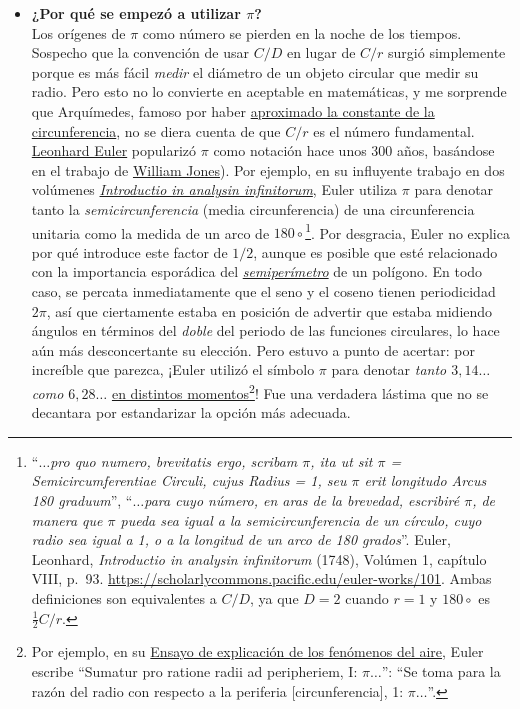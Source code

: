 \begin{itemize}
  \item \textbf{¿Por qué se empezó a utilizar $\pi$?} \\ Los orígenes de $\pi$ como número se pierden en la noche de los tiempos. Sospecho que la convención de usar $C/D$ en lugar de $C/r$ surgió simplemente porque es más fácil \emph{medir} el diámetro de un objeto circular que medir su radio. Pero esto no lo convierte en aceptable en matemáticas, y me sorprende que Arquímedes, famoso por haber \href{http://itech.fgcu.edu/faculty/clindsey/mhf4404/archimedes/archimedes.html}{aproximado la constante de la circunferencia}, no se diera cuenta de que $C/r$ es el número fundamental. \href{https://es.wikipedia.org/wiki/Leonhard_Euler}{Leonhard Euler} popularizó $\pi$ como notación hace unos 300 años, basándose en el trabajo de \href{https://es.wikipedia.org/wiki/William_Jones_(matemático)}{William Jones}). Por ejemplo, en su influyente trabajo en dos volúmenes \href{https://es.wikipedia.org/wiki/Introductio_in_analysin_infinitorum}{\emph{Introductio in analysin infinitorum}}, Euler utiliza $\pi$ para denotar tanto la \emph{semicircunferencia} (media circunferencia) de una circunferencia unitaria como la medida de un arco de $180\circ$\footnote{``\emph{$\ldots$pro quo numero, brevitatis ergo, scribam $\pi$, ita ut sit $\pi$ = Semicircumferentiae Circuli, cujus Radius = 1, seu $\pi$ erit longitudo Arcus 180 graduum}'', ``\emph{$\ldots$para cuyo número, en aras de la brevedad, escribiré $\pi$, de manera que $\pi$ pueda sea igual a la semicircunferencia de un círculo, cuyo radio sea igual a 1, o a la longitud de un arco de 180 grados}''. Euler, Leonhard, \emph{Introductio in analysin infinitorum} (1748), Volúmen 1, capítulo VIII, p.~93. \href{https://scholarlycommons.pacific.edu/euler-works/101}{https://scholarlycommons.pacific.edu/euler-works/101}. Ambas definiciones son equivalentes a $C/D$, ya que $D=2$ cuando $r=1$ y $180\circ$ es $\frac{1}{2}C/r$.}. Por desgracia, Euler no explica por qué introduce este factor de $1/2$, aunque es posible que esté relacionado con la importancia esporádica del \href{https://es.wikipedia.org/wiki/Semiper%C3%ADmetro}{\emph{semiperímetro}} de un polígono. En todo caso, se percata inmediatamente que el seno y el coseno tienen periodicidad $2\pi$, así que ciertamente estaba en posición de advertir que estaba midiendo ángulos en términos del \emph{doble} del periodo de las funciones circulares, lo hace aún más desconcertante su elección. Pero estuvo a punto de acertar: por increíble que parezca, ¡Euler utilizó el símbolo $\pi$ para denotar \emph{tanto $3,14\ldots$ como $6,28\ldots$} \href{https://en.wikipedia.org/wiki/Pi#Adoption_of_the_symbol_%CF%80}{en distintos momentos}\footnote{Por ejemplo, en su \href{http://eulerarchive.maa.org/docs/originals/E007.pdf#page=5}{Ensayo de explicación de los fenómenos del aire}, Euler escribe ``Sumatur pro ratione radii ad peripheriem, I: $\pi\ldots$'': ``Se toma para la razón del radio con respecto a la periferia [circunferencia], 1: $\pi\ldots$''.}! Fue una verdadera lástima que no se decantara por estandarizar la opción más adecuada.


\end{itemize}
